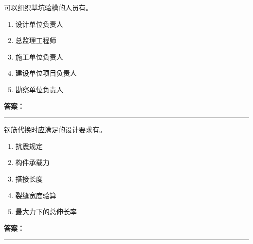 \documentclass[UTF8,fontset=fandol,11pt]{ctexart}
\newcommand{\answerline}{\textcolor{answerred}{\rule{2.4cm}{0.7pt}}}
\begin{document}
\begin{quizbox}[title={乱序第 152 题｜第一章土方工程}]

可以组织基坑验槽的人员有。\\

\begin{enumerate}[label=\Alph*.]

\item 设计单位负责人

\item 总监理工程师

\item 施工单位负责人

\item 建设单位项目负责人

\item 勘察单位负责人

\end{enumerate}

\textbf{\textcolor{answerred}{答案：}} \answerline

\end{quizbox}

\vspace{0.2em}

\begin{quizbox}[title={乱序第 153 题｜第四章混凝土结构工程}]

钢筋代换时应满足的设计要求有。\\

\begin{enumerate}[label=\Alph*.]

\item 抗震规定

\item 构件承载力

\item 搭接长度

\item 裂缝宽度验算

\item 最大力下的总伸长率

\end{enumerate}

\textbf{\textcolor{answerred}{答案：}} \answerline

\end{quizbox}

\vspace{0.2em}
\end{document}
